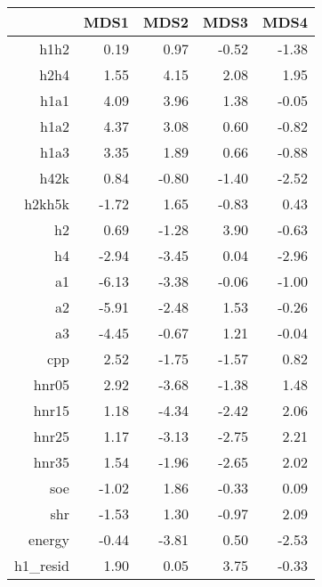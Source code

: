 \begin{table}[ht]
\centering
\begin{tabular}{rrrrr}
  \hline
 & MDS1 & MDS2 & MDS3 & MDS4 \\ 
  \hline
h1h2 & 0.19 & 0.97 & -0.52 & -1.38 \\ 
  h2h4 & 1.55 & 4.15 & 2.08 & 1.95 \\ 
  h1a1 & 4.09 & 3.96 & 1.38 & -0.05 \\ 
  h1a2 & 4.37 & 3.08 & 0.60 & -0.82 \\ 
  h1a3 & 3.35 & 1.89 & 0.66 & -0.88 \\ 
  h42k & 0.84 & -0.80 & -1.40 & -2.52 \\ 
  h2kh5k & -1.72 & 1.65 & -0.83 & 0.43 \\ 
  h2 & 0.69 & -1.28 & 3.90 & -0.63 \\ 
  h4 & -2.94 & -3.45 & 0.04 & -2.96 \\ 
  a1 & -6.13 & -3.38 & -0.06 & -1.00 \\ 
  a2 & -5.91 & -2.48 & 1.53 & -0.26 \\ 
  a3 & -4.45 & -0.67 & 1.21 & -0.04 \\ 
  cpp & 2.52 & -1.75 & -1.57 & 0.82 \\ 
  hnr05 & 2.92 & -3.68 & -1.38 & 1.48 \\ 
  hnr15 & 1.18 & -4.34 & -2.42 & 2.06 \\ 
  hnr25 & 1.17 & -3.13 & -2.75 & 2.21 \\ 
  hnr35 & 1.54 & -1.96 & -2.65 & 2.02 \\ 
  soe & -1.02 & 1.86 & -0.33 & 0.09 \\ 
  shr & -1.53 & 1.30 & -0.97 & 2.09 \\ 
  energy & -0.44 & -3.81 & 0.50 & -2.53 \\ 
  h1\_resid & 1.90 & 0.05 & 3.75 & -0.33 \\ 
   \hline
\end{tabular}
\end{table}
